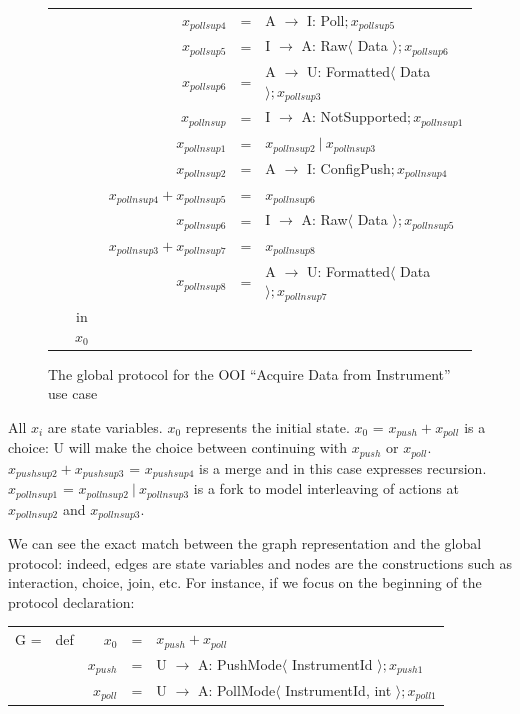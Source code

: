 \documentclass[a4paper,11pt,twoside]{report}
\begin{document}
\begin{figure}[h]
\begin{tabular}{rcrcl}
&& $x_{pollsup4}$ &=& A $\rightarrow$ I: Poll$ ; x_{pollsup5}$\\
&& $x_{pollsup5}$ &=&  I $\rightarrow$ A: Raw$\langle$ Data $\rangle ; x_{pollsup6}$\\
&& $x_{pollsup6}$ &=& A $\rightarrow$ U: Formatted$\langle$ Data $\rangle ; x_{pollsup3}$\\
&& $x_{pollnsup}$ &=& I $\rightarrow$ A: NotSupported$ ; x_{pollnsup1}$\\
&& $x_{pollnsup1}$& = &$ x_{pollnsup2}\ |\ x_{pollnsup3}$\\
&& $x_{pollnsup2}$ &=& A $\rightarrow$ I: ConfigPush$ ; x_{pollnsup4}$\\
&& $x_{pollnsup4} + x_{pollnsup5}$ &=& $ x_{pollnsup6}$ \\
&& $ x_{pollnsup6}$ &=& I $\rightarrow$ A: Raw$\langle$ Data $\rangle ; x_{pollnsup5}$\\
&& $x_{pollnsup3} + x_{pollnsup7}$ &=&$ x_{pollnsup8}$ \\
&& $ x_{pollnsup8}$ &=& A $\rightarrow$ U: Formatted$\langle$ Data $\rangle ; x_{pollnsup7}$\\
& in $x_{0}$&&&\\
\end{tabular}
\caption{The global protocol for the OOI ``Acquire Data from Instrument'' use case\label{fig:ooi_example1}}
\end{figure}
All $x_{i}$ are state variables. $x_0$ represents the initial state. $ x_{0}$ = $x_{push} + x_{poll}$ is a choice: U will make the choice between continuing with $x_{push}$ or $x_{poll}$. $x_{pushsup2} + x_{pushsup3}$ = $x_{pushsup4}$ is a merge and in this case expresses recursion. $x_{pollnsup1}$ = $ x_{pollnsup2}\ |\ x_{pollnsup3}$ is a fork to model interleaving of actions at $x_{pollnsup2}$ and $x_{pollnsup3}$.

We can see the exact match between the graph representation and the global protocol: indeed, edges are state variables and nodes are the constructions such as interaction, choice, join, etc. For instance, if we focus on the beginning of the protocol declaration:\\

\begin{tabular}{rcrcl}
G =& def & $x_{0}$ &=& $x_{push} + x_{poll}$\\
&& $x_{push}$ &=& U $\rightarrow$ A: PushMode$\langle$ InstrumentId $\rangle ; x_{push1}$\\
&& $x_{poll}$ &=& U $\rightarrow$ A: PollMode$\langle$ InstrumentId, int $\rangle ; x_{poll1}$\\
\end{tabular}
\end{document}
